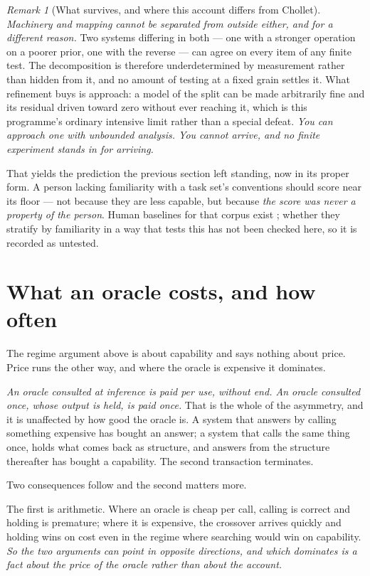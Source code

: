 \documentclass[11pt,a4paper]{article}
\theoremstyle{remark}
\newtheorem{remark}[definition]{Remark}
\begin{document}
\begin{remark}[What survives, and where this account differs from Chollet]
\emph{Machinery and mapping cannot be separated from outside either, and for a different reason.} Two
systems differing in both --- one with a stronger operation on a poorer prior, one with the reverse ---
can agree on every item of any finite test. The decomposition is therefore underdetermined by
measurement rather than hidden from it, and no amount of testing at a fixed grain settles it. What
refinement buys is approach: a model of the split can be made arbitrarily fine and its residual driven
toward zero without ever reaching it, which is this programme's ordinary intensive limit rather than a
special defeat. \emph{You can approach one with unbounded analysis. You cannot arrive, and no finite
experiment stands in for arriving.}

That yields the prediction the previous section left standing, now in its proper form. A person lacking
familiarity with a task set's conventions should score near its floor --- not because they are less
capable, but because \emph{the score was never a property of the person}. Human baselines for that
corpus exist \citep{legris2025}; whether they stratify by familiarity in a way that tests this has not
been checked here, so it is recorded as untested.
\end{remark}

\section{What an oracle costs, and how often}\label{sec:oracle}
The regime argument above is about capability and says nothing about price. Price runs the other way,
and where the oracle is expensive it dominates.

\emph{An oracle consulted at inference is paid per use, without end. An oracle consulted once, whose
output is held, is paid once.} That is the whole of the asymmetry, and it is unaffected by how good the
oracle is. A system that answers by calling something expensive has bought an answer; a system that
calls the same thing once, holds what comes back as structure, and answers from the structure
thereafter has bought a capability. The second transaction terminates.

Two consequences follow and the second matters more.

The first is arithmetic. Where an oracle is cheap per call, calling is correct and holding is
premature; where it is expensive, the crossover arrives quickly and holding wins on cost even in the
regime where searching would win on capability. \emph{So the two arguments can point in opposite
directions, and which dominates is a fact about the price of the oracle rather than about the account.}
\end{document}
